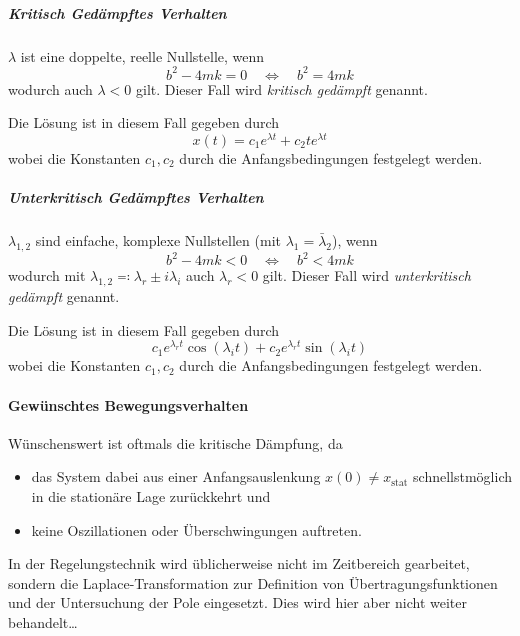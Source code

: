 \documentclass[a4paper, 11pt, accentcolor = tud3b]{tudreport}
\begin{document}
						\subparagraph{Kritisch Gedämpftes Verhalten}
							\( \lambda \) ist eine doppelte, reelle Nullstelle, wenn
							\begin{equation*}
								b^2 - 4mk = 0 \quad\iff\quad b^2 = 4mk
							\end{equation*}
							wodurch auch \( \lambda < 0 \) gilt. Dieser Fall wird \emph{kritisch gedämpft} genannt.
							
							Die Lösung ist in diesem Fall gegeben durch
							\begin{equation*}
								x(t) = c_1 e^{\lambda t} + c_2 t e^{\lambda t}
							\end{equation*}
							wobei die Konstanten \( c_1, c_2 \) durch die Anfangsbedingungen festgelegt werden.
						
						\subparagraph{Unterkritisch Gedämpftes Verhalten}
							\( \lambda_{1, 2} \) sind einfache, komplexe Nullstellen (mit \( \lambda_1 = \bar{\lambda}_2 \)), wenn
							\begin{equation*}
								b^2 - 4mk < 0 \quad\iff\quad b^2 < 4mk
							\end{equation*}
							wodurch mit \( \lambda_{1, 2} \eqqcolon \lambda_r \pm i \lambda_i \) auch \( \lambda_r < 0 \) gilt. Dieser Fall wird \emph{unterkritisch gedämpft} genannt.
							
							Die Lösung ist in diesem Fall gegeben durch
							\begin{equation*}
								c_1 e^{\lambda_r t} \cos(\lambda_i t) + c_2 e^{\lambda_r t} \sin(\lambda_i t)
							\end{equation*}
							wobei die Konstanten \( c_1, c_2 \) durch die Anfangsbedingungen festgelegt werden.

					\paragraph{Gewünschtes Bewegungsverhalten}
						Wünschenswert ist oftmals die kritische Dämpfung, da
						\begin{itemize}
							\item das System dabei aus einer Anfangsauslenkung \( x(0) \neq x_\text{stat} \) schnellstmöglich in die stationäre Lage zurückkehrt und
							\item keine Oszillationen oder Überschwingungen auftreten.
						\end{itemize}
					
						In der Regelungstechnik wird üblicherweise nicht im Zeitbereich gearbeitet, sondern die Laplace-Transformation zur Definition von Übertragungsfunktionen und der Untersuchung der Pole eingesetzt. Dies wird hier aber nicht weiter behandelt\dots
\end{document}
